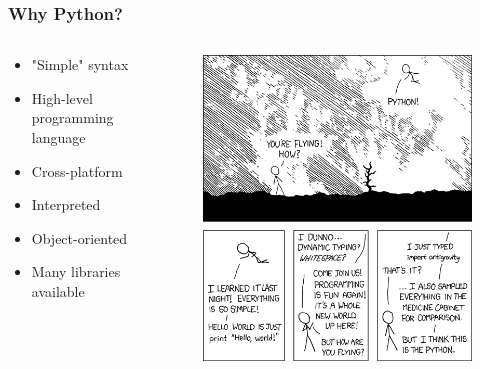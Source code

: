 \documentclass[10pt, a4paper]{beamer} %
\begin{document}
\begin{frame}[c]\frametitle{Why Python?}
    \begin{columns}
        \begin{column}{0.5\textwidth}
           \begin{itemize}
                \item "Simple" syntax
                \item High-level programming language
                \item Cross-platform
                \item Interpreted
                \item Object-oriented
                \item Many libraries available
            \end{itemize}
        \end{column}
        \begin{column}{0.5\textwidth}  %
            \begin{figure}
                \includegraphics[width=0.9\linewidth]{pics/python.png}
            \end{figure}
        \end{column}
    \end{columns}

\end{frame}
\end{document}
